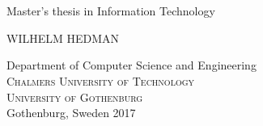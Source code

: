 
\begin{titlepage}
			
\vspace*{-2cm}
\noindent{}
\noindent\makebox[\linewidth][l]{\rule{16.5cm}{0.1pt}}

\begin{figure}[H]
\centering
\vspace{2cm}	%
\end{figure}

\mbox{}
\vfill
\renewcommand{\familydefault}{\sfdefault} \normalfont %
\textbf{{\Huge 	\toptitle 	\\[0.2cm] 
				\bottomtitle}} 	\\[0.5cm]
Master's thesis in Information Technology\setlength{\parskip}{1cm}

{\Large WILHELM HEDMAN} \setlength{\parskip}{2.9cm}

\noindent\makebox[\linewidth][l]{\rule{16.5cm}{0.1pt}}
Department of Computer Science and Engineering \\
\textsc{Chalmers University of Technology} \\
\textsc{University of Gothenburg} \\
Gothenburg, Sweden 2017

\renewcommand{\familydefault}{\rmdefault} \normalfont %
\end{titlepage}


\newpage
\restoregeometry
\thispagestyle{empty}
\mbox{}


